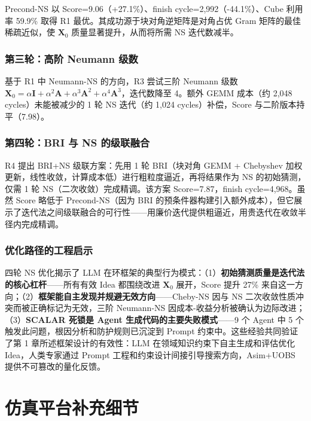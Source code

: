 \documentclass{CjC}
\begin{document}
Precond-NS 以 Score=9.06（+27.1\%）、finish cycle=2,992（-44.1\%）、Cube 利用率 59.9\% 取得 R1 最优。其成功源于块对角逆矩阵是对角占优 Gram 矩阵的最佳稀疏近似，使 $\bm{X}_0$ 质量显著提升，从而将所需 NS 迭代数减半。

\subsubsection{第三轮：高阶 Neumann 级数}

基于 R1 中 Neumann-NS 的方向，R3 尝试三阶 Neumann 级数 $\bm{X}_0 = \alpha\bm{I} + \alpha^2\bm{A} + \alpha^3\bm{A}^2 + \alpha^4\bm{A}^3$，迭代数降至 4。额外 GEMM 成本（约 2,048 cycles）未能被减少的 1 轮 NS 迭代（约 1,024 cycles）补偿，Score 与二阶版本持平（7.98）。

\subsubsection{第四轮：BRI 与 NS 的级联融合}

R4 提出 BRI+NS 级联方案：先用 1 轮 BRI（块对角 GEMM + Chebyshev 加权更新，线性收敛，计算成本低）进行粗粒度逼近，再将结果作为 NS 的初始猜测，仅需 1 轮 NS（二次收敛）完成精调。该方案 Score=7.87，finish cycle=4,968。虽然 Score 略低于 Precond-NS（因为 BRI 的预条件器构建引入额外成本），但它展示了迭代法之间级联融合的可行性——用廉价迭代提供粗逼近，用贵迭代在收敛半径内完成精调。

\subsubsection{优化路径的工程启示}

四轮 NS 优化揭示了 LLM 在环框架的典型行为模式：（1）\textbf{初始猜测质量是迭代法的核心杠杆}——所有有效 Idea 都围绕改进 $\bm{X}_0$ 展开，Score 提升 27\% 来自这一方向；（2）\textbf{框架能自主发现并规避无效方向}——Cheby-NS 因与 NS 二次收敛性质冲突而被正确标记为无效，三阶 Neumann-NS 因成本-收益分析被确认为边际改进；（3）\textbf{SCALAR 死锁是 Agent 生成代码的主要失败模式}——9 个 Agent 中 5 个触发此问题，根因分析和防护规则已沉淀到 Prompt 约束中。这些经验共同验证了第 1 章所述框架设计的有效性：LLM 在领域知识约束下自主生成和评估优化 Idea，人类专家通过 Prompt 工程和约束设计间接引导搜索方向，Asim+UOBS 提供不可篡改的量化反馈。


\appendix

\section{仿真平台补充细节}
\end{document}
